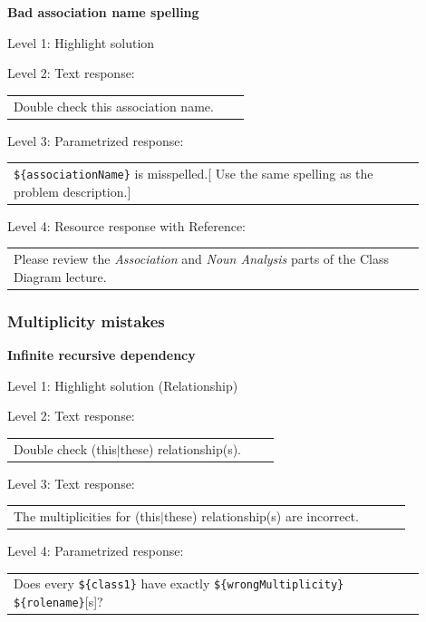 \noindent \textbf{Bad association name spelling} \medskip

\noindent Level 1: Highlight solution  \medskip

\noindent Level 2: Text response: \medskip

\begin{tabular}{|p{0.9\linewidth}}
Double check this association name.
\end{tabular} \medskip

\noindent Level 3: Parametrized response: \medskip

\begin{tabular}{|p{0.9\linewidth}}
\verb|${associationName}| is misspelled.[ Use the same spelling as the problem description.]
\end{tabular} \medskip

\noindent Level 4: Resource response with Reference: \medskip

\begin{tabular}{|p{0.9\linewidth}}
Please review the \textit{Association} and \textit{Noun Analysis} parts of the Class Diagram lecture.
\end{tabular} \medskip


\subsubsection{Multiplicity mistakes}

\noindent \textbf{Infinite recursive dependency} \medskip

\noindent Level 1: Highlight solution (Relationship) \medskip

\noindent Level 2: Text response: \medskip

\begin{tabular}{|p{0.9\linewidth}}
Double check (this$|$these) relationship(s).
\end{tabular} \medskip

\noindent Level 3: Text response: \medskip

\begin{tabular}{|p{0.9\linewidth}}
The multiplicities for (this$|$these) relationship(s) are incorrect.
\end{tabular} \medskip

\noindent Level 4: Parametrized response: \medskip

\begin{tabular}{|p{0.9\linewidth}}
Does every \verb|${class1}| have exactly \verb|${wrongMultiplicity}| \verb|${rolename}|[s]?
\end{tabular} \medskip

